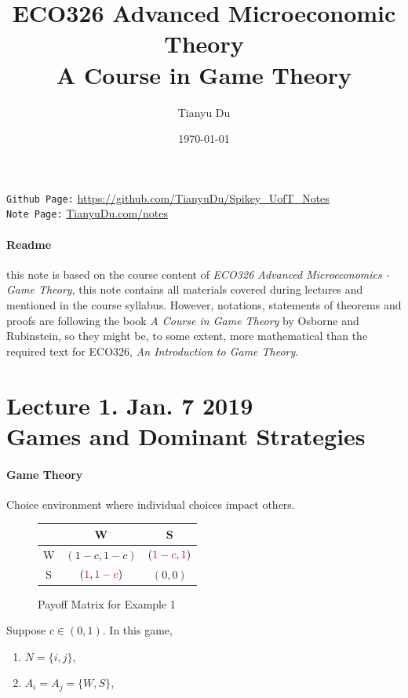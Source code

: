 \documentclass[11pt]{article}
\title{ECO326 Advanced Microeconomic Theory \\ \small A Course in Game Theory}
\author{Tianyu Du}
\date{\today}
\begin{document}
	\maketitle
	\texttt{Github Page:} \url{https://github.com/TianyuDu/Spikey_UofT_Notes}\\
	\texttt{Note Page:} \url{TianyuDu.com/notes}
	\paragraph{Readme} this note is based on the course content of \emph{ECO326 Advanced Microeconomics - Game Theory}, this note contains all materials covered during lectures and mentioned in the course syllabus. However, notations, statements of theorems and proofs are following the book \emph{A Course in Game Theory} by Osborne and Rubinstein, so they might be, to some extent, more mathematical than the required text for ECO326, \emph{An Introduction to Game Theory}.
	
	\tableofcontents
	\newpage
	
	\section{Lecture 1. Jan. 7 2019\\Games and Dominant Strategies}
		\paragraph{Game Theory} Choice environment where individual choices impact others.
		
		\begin{example}
			\begin{figure}[h]
				\centering
				  \begin{tabular}{c|c|c}
				    & W & S\\
				    \hline
				    W & $(1-c, 1-c)$ & $(\textcolor{red}{1-c}, \textcolor{red}{1})$ \\
				    \hline
				    S & $(\textcolor{red}{1}, \textcolor{red}{1-c})$ & $(0, 0)$
				  \end{tabular}
				  \caption{Payoff Matrix for Example 1}
			\end{figure}
		\end{example}
		Suppose $c \in (0, 1)$. In this game,
		\begin{enumerate}[i]
			\item $N = \{i, j\}$,
			\item $A_i = A_j = \{W, S\}$,
		\end{enumerate}
		
\end{document}
